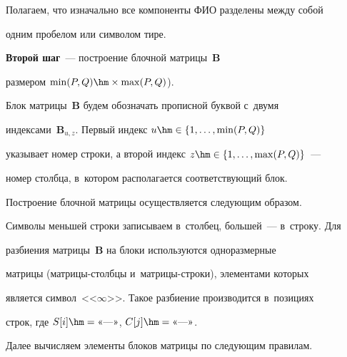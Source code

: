   Полагаем, что изначально все компоненты ФИО разделены между собой 


одним пробелом или символом тире.


  


  \textbf{Второй шаг}~--- построение блочной матрицы~$\mathbf{B}$ 


размером $\min (P,Q)\hm\times \max (P,Q)$). 


  


  Блок матрицы~$\mathbf{B}$ будем обозначать прописной буквой с~двумя 


индексами~$\mathbf{B}_{u,z}$. Первый индекс $u\hm\in \{1,\ldots,\min(P,Q)\}$ 


указывает номер строки, а второй индекс $z\hm\in \{1,\ldots, \max(P,Q)\}$~--- 


номер столбца, в~котором располагается со\-от\-вет\-ст\-ву\-ющий блок.


  


  Построение блочной матрицы осуществляется следующим образом. 


  


  Символы меньшей строки записываем в~столбец, большей~--- в~строку. Для 


разбиения матрицы~$\mathbf{B}$ на блоки используются одноразмерные 


матрицы (мат\-ри\-цы-столбцы и~мат\-ри\-цы-стро\-ки), элементами которых 


является символ~<<$\infty$>>. Такое разбиение производится в~позициях 


строк, где $S[i]\hm= \mbox{<<--->>}$, $C[j]\hm= \mbox{<<--->>}$.


  


  Далее вычисляем элементы блоков матрицы по следующим правилам.


